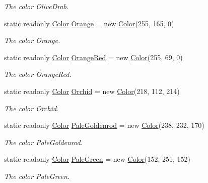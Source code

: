 \begin{DoxyCompactItemize}
\begin{DoxyCompactList}\small\item\em The color Olive\-Drab. \end{DoxyCompactList}\item 
static readonly \hyperlink{struct_tri_devs_1_1_tri_engine_1_1_color}{Color} \hyperlink{struct_tri_devs_1_1_tri_engine_1_1_color_a75c9a43eb0d61e001bc6c5feba551bf5}{Orange} = new \hyperlink{struct_tri_devs_1_1_tri_engine_1_1_color}{Color}(255, 165, 0)
\begin{DoxyCompactList}\small\item\em The color Orange. \end{DoxyCompactList}\item 
static readonly \hyperlink{struct_tri_devs_1_1_tri_engine_1_1_color}{Color} \hyperlink{struct_tri_devs_1_1_tri_engine_1_1_color_a9fd0642af05fc928adb65c3f1e89ef55}{Orange\-Red} = new \hyperlink{struct_tri_devs_1_1_tri_engine_1_1_color}{Color}(255, 69, 0)
\begin{DoxyCompactList}\small\item\em The color Orange\-Red. \end{DoxyCompactList}\item 
static readonly \hyperlink{struct_tri_devs_1_1_tri_engine_1_1_color}{Color} \hyperlink{struct_tri_devs_1_1_tri_engine_1_1_color_a4a38d414ebf3e2f37e2506561a2e2822}{Orchid} = new \hyperlink{struct_tri_devs_1_1_tri_engine_1_1_color}{Color}(218, 112, 214)
\begin{DoxyCompactList}\small\item\em The color Orchid. \end{DoxyCompactList}\item 
static readonly \hyperlink{struct_tri_devs_1_1_tri_engine_1_1_color}{Color} \hyperlink{struct_tri_devs_1_1_tri_engine_1_1_color_a089605daa4994fb559e680263c562555}{Pale\-Goldenrod} = new \hyperlink{struct_tri_devs_1_1_tri_engine_1_1_color}{Color}(238, 232, 170)
\begin{DoxyCompactList}\small\item\em The color Pale\-Goldenrod. \end{DoxyCompactList}\item 
static readonly \hyperlink{struct_tri_devs_1_1_tri_engine_1_1_color}{Color} \hyperlink{struct_tri_devs_1_1_tri_engine_1_1_color_ad1715eb16c71e0eda750768b81989ffa}{Pale\-Green} = new \hyperlink{struct_tri_devs_1_1_tri_engine_1_1_color}{Color}(152, 251, 152)
\begin{DoxyCompactList}\small\item\em The color Pale\-Green. \end{DoxyCompactList}\item 

\end{DoxyCompactItemize}

